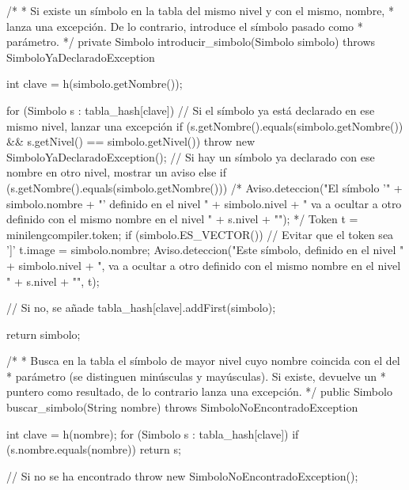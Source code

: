 \begin{codigo}[style=java,caption={Función \url{lib.semantico.TablaSimbolos.introducir_simbolo}},label={introducir}]
	/*
	 * Si existe un símbolo en la tabla del mismo nivel y con el mismo, nombre,
	 * lanza una excepción. De lo contrario, introduce el símbolo pasado como
	 * parámetro.
	 */
	private Simbolo introducir_simbolo(Simbolo simbolo) throws SimboloYaDeclaradoException {
		int clave = h(simbolo.getNombre());

		for (Simbolo s : tabla_hash[clave]) {
			// Si el símbolo ya está declarado en ese mismo nivel, lanzar una excepción
			if (s.getNombre().equals(simbolo.getNombre()) && s.getNivel() == simbolo.getNivel()) {
				throw new SimboloYaDeclaradoException();
			}
			// Si hay un símbolo ya declarado con ese nombre en otro nivel, mostrar un aviso
			else if (s.getNombre().equals(simbolo.getNombre())) {
				/*
				Aviso.deteccion("El símbolo '" +
						simbolo.nombre + "' definido en el nivel " + simbolo.nivel
						+ " va a ocultar a otro definido con el mismo nombre en el nivel " + s.nivel + "");
			     */
				Token t = minilengcompiler.token;
				if (simbolo.ES_VECTOR()) {
					// Evitar que el token sea ']'
					t.image = simbolo.nombre;
				}
				Aviso.deteccion("Este símbolo, definido en el nivel " + simbolo.nivel +
						", va a ocultar a otro definido con el mismo nombre en el nivel " + s.nivel + "",
						t);
			}
		}

		// Si no, se añade
		tabla_hash[clave].addFirst(simbolo);

		return simbolo;
	}
\end{codigo}


\begin{codigo}[style=java,caption={Función \url{lib.semantico.TablaSimbolos.buscar_simbolo}},label={buscar}]
/*
 * Busca en la tabla el símbolo de mayor nivel cuyo nombre coincida con el del
 * parámetro (se distinguen minúsculas y mayúsculas). Si existe, devuelve un
 * puntero como resultado, de lo contrario lanza una excepción.
 */
public Simbolo buscar_simbolo(String nombre) throws SimboloNoEncontradoException {
    int clave = h(nombre);
    for (Simbolo s : tabla_hash[clave]) {
        if (s.nombre.equals(nombre)) {
            return s;
        }
    }

    // Si no se ha encontrado
    throw new SimboloNoEncontradoException();
}
\end{codigo}
